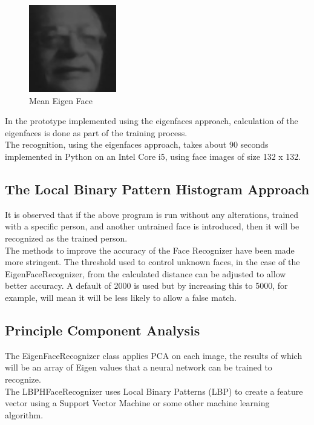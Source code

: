 \begin{figure}[!t]
\centering
\includegraphics[width=1.5in]{./gulzar.png}
\caption{Mean Eigen Face}
\label{fig:meigenface}
\end{figure}

In the prototype implemented using the eigenfaces approach, calculation of the
eigenfaces is done as part of the training process. \\
The recognition, using the eigenfaces approach, takes about 90 seconds
implemented in Python on an Intel Core i5, using face images of size 132 x 132. \\

\subsection{The Local Binary Pattern Histogram Approach}
It is observed that if the above program is run without any alterations,
trained with a specific person, and another untrained face is introduced,
then it will be recognized as the trained person. \\
The methods to improve the accuracy of the Face Recognizer have been made more
stringent. The threshold used to control unknown faces, in the case of the
EigenFaceRecognizer, from the calculated distance can be adjusted to allow better
accuracy. A default of 2000 is used but by increasing this to 5000, for example,
will mean it will be less likely to allow a false match. \\

\subsection{Principle Component Analysis}
The EigenFaceRecognizer class applies PCA on each image, the results of which will
be an array of Eigen values that a neural network can be trained to recognize. \\
The LBPHFaceRecognizer uses Local Binary Patterns (LBP) to create a feature vector
using a Support Vector Machine or some other machine learning algorithm. \\

